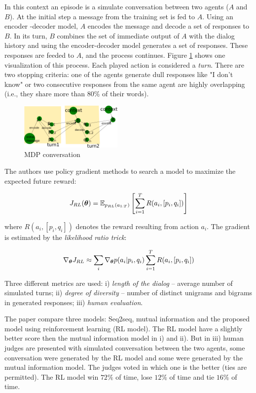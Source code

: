 \par In this context an episode is a simulate conversation between two agents ($A$ and $B$). At the initial step a message from the training set is fed to $A$. Using an encoder -decoder model, $A$ encodes the message and decode a set of responses to $B$. In its turn, $B$ combines the set of immediate output of $A$ with the dialog history and using the encoder-decoder model generates a set of responses. These responses are feeded to $A$, and the process continues. Figure \ref{MDPConver} shows one visualization of this process. Each played action is considered a \textit{turn}. There are two stopping criteria: one of the agents generate dull responses like "I don't know" or two consecutive responses from the same agent are highly overlapping (i.e., they share more than $80\%$ of their words).


\begin{figure}[ht!]
\label{MDPConver}
\includegraphics[width=5cm]{img/MDPconversation_placeholder.png}
\caption{MDP conversation}
\end{figure}

\par The authors use policy gradient methods to search a model to maximize the expected future reward:

\begin{equation}
J_{RL}(\bm{\theta}) = \operatorname{\mathbb{E}}_{p_{RL}(a_{1:T})} \left[\sum_{i=1}^{T} R(a_i, [p_i, q_i]) \right]
\end{equation}

where $R(a_i, [p_i, q_i])$ denotes the reward resulting from action $a_i$. The gradient is estimated by the \textit{likelihood ratio trick}:

\begin{equation}
\nabla_{\bm{\theta}} {J_{RL}} \approx \sum_{i} \nabla_{\bm{\theta}} {p(a_{i} | p_{i}, q_{i})} \sum_{i=1}^{T}R(a_i, [p_{i}, q_{i}])
\end{equation}

\par Three different metrics are used: i) \textit{length of the dialog} -- average number of simulated turns; ii) \textit{degree of diversity} -- number of distinct unigrams and bigrams in generated responses; iii) \textit{human evaluation}.

\par The paper compare three models: Seq2seq, mutual information and the proposed model using reinforcement learning (RL model). The RL model have a slightly better score then the mutual information model in i) and ii). But in iii) human judges are presented with simulated conversation between the two agents, some conversation were generated by the RL model and some were generated by the mutual information model. The judges voted in which one is the better (ties are permitted).  The RL model win $72\%$ of time, lose $12\%$ of time and tie $16\%$ of time.
